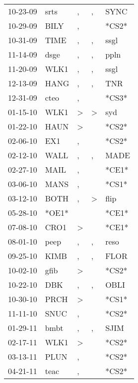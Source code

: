 \begin{supertabular}{lllll}
 10-23-09 &   srts &             , &             , &   SYNC \\
 10-29-09 &   BILY &             , &               &  *CS2* \\
 10-31-09 &   TIME &             , &             , &   ssgl \\
 11-14-09 &   dsge &             , &             , &   ppln \\
 11-20-09 &   WLK1 &             , &             , &   ssgl \\
 12-13-09 &   HANG &             , &             , &    TNR \\
 12-31-09 &   cteo &             , &               &  *CS3* \\
 01-15-10 &   WLK1 &  \textgreater &  \textgreater &    syd \\
 01-22-10 &   HAUN &  \textgreater &               &  *CS2* \\
 02-06-10 &    EX1 &             , &               &  *CS2* \\
 02-12-10 &   WALL &             , &             , &   MADE \\
 02-27-10 &   MAIL &             , &               &  *CE1* \\
 03-06-10 &   MANS &             , &               &  *CS1* \\
 03-12-10 &   BOTH &             , &  \textgreater &   flip \\
 05-28-10 &  *OE1* &               &               &  *CE1* \\
 07-08-10 &   CRO1 &  \textgreater &               &  *CE1* \\
 08-01-10 &   peep &             , &             , &   reso \\
 09-25-10 &   KIMB &             , &             , &   FLOR \\
 10-02-10 &   gfib &  \textgreater &               &  *CS2* \\
 10-22-10 &    DBK &             , &             , &   OBLI \\
 10-30-10 &   PRCH &  \textgreater &               &  *CS1* \\
 11-11-10 &   SNUC &             , &               &  *CS2* \\
 01-29-11 &   bmbt &             , &             , &   SJIM \\
 02-17-11 &   WLK1 &  \textgreater &               &  *CS2* \\
 03-13-11 &   PLUN &             , &               &  *CS2* \\
 04-21-11 &   teac &             , &               &  *CS2* \\

\end{supertabular}
